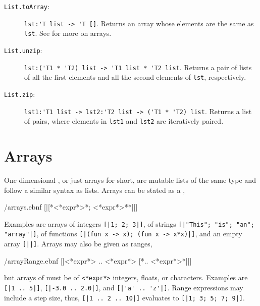 \documentclass[fsharpnotes.tex]{subfiles}
\begin{document}
\begin{description}
\item[\texttt{List.toArray}:] \lstinline{lst:'T list -> 'T []}. Returns an array whose elements are the same as \lstinline{lst}.  See  for more on arrays.
\item[\texttt{List.unzip}:] \lstinline{lst:('T1 * 'T2) list -> 'T1 list * 'T2 list}. Returns a pair of lists of all the first elements and all the second elements of \lstinline{lst}, respectively.
\item[\texttt{List.zip}:] \lstinline{lst1:'T1 list -> lst2:'T2 list -> ('T1 * 'T2) list}. Returns a list of pairs, where elements in \lstinline{lst1} and \lstinline{lst2} are iteratively paired.
\end{description}

\section{Arrays}
\label{sec:arrays}
One dimensional , or just arrays for short, are mutable lists of the same type and follow a similar syntax as lists. Arrays can be stated as a ,
%
\begin{verbatimwrite}{\ebnf/arrays.ebnf}
[|[*<*expr*>{*; <*expr*>*}*]|]
\end{verbatimwrite}
%
Examples are arrays of integers \mbox{\lstinline![|1; 2; 3|]!}, of strings \mbox{\lstinline![|"This"; "is"; "an"; "array"|]!}, of functions \mbox{\lstinline![|(fun x -> x); (fun x -> x*x)|]!}, and an empty array \lstinline![||]!.  Arrays may also be given as ranges,
%
\begin{verbatimwrite}{\ebnf/arrayRange.ebnf}
[|<*expr*> .. <*expr*> [*.. <*expr*>*]|]
\end{verbatimwrite}
%
but arrays of  must be of \lstinline[language=syntax]{<*expr*>} integers, floats, or characters. Examples are \mbox{\lstinline![|1 .. 5|]!}, \mbox{\lstinline![|-3.0 .. 2.0|]!}, and \mbox{\lstinline![|'a' .. 'z'|]!}. Range expressions may include a step size, thus, \mbox{\lstinline![|1 .. 2 .. 10|]!} evaluates to \mbox{\lstinline![|1; 3; 5; 7; 9|]!}.
\end{document}
